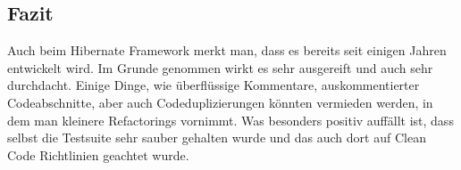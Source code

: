 \subsection{Fazit}
Auch beim Hibernate Framework merkt man, dass es bereits seit einigen Jahren entwickelt wird. Im Grunde genommen wirkt es sehr ausgereift und auch sehr durchdacht. Einige Dinge, wie überflüssige Kommentare, auskommentierter Codeabschnitte, aber auch Codeduplizierungen könnten vermieden werden, in dem man kleinere Refactorings vornimmt. Was besonders positiv auffällt ist, dass selbst die Testsuite sehr sauber gehalten wurde und das auch dort auf Clean Code Richtlinien geachtet wurde. 
